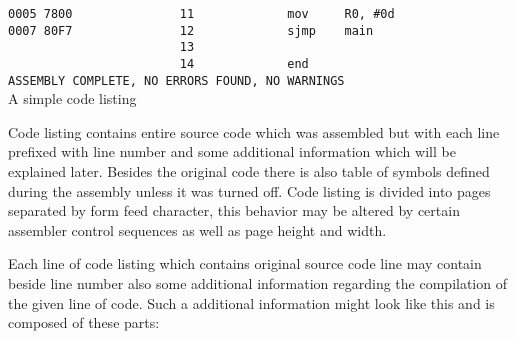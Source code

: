 \begin{code}[h]
                        {\color{highlight_lst_address}\verb'0005'}{\color{highlight_lst_code}\verb' 7800'}{\color{highlight_lst_line}\verb'               11'}\verb'             '{\color{highlight_instruction}\verb'mov'}\verb'     '{\color{highlight_sfr}\verb'R0'}{\color{highlight_oper_sep}\verb','}\verb' '{\color{highlight_imm_dec}\verb'#0d'}\\
                        {\color{highlight_lst_address}\verb'0007'}{\color{highlight_lst_code}\verb' 80F7'}{\color{highlight_lst_line}\verb'               12'}\verb'             '{\color{highlight_instruction}\verb'sjmp'}\verb'    '{\color{highlight_constant}\verb'main'}\\
                        {\color{highlight_lst_line}\verb'                        13'}\\
                        {\color{highlight_lst_line}\verb'                        14'}\verb'             '{\color{highlight_directive}\verb'end'}\\
                        {\color{highlight_lst_msg}\verb'ASSEMBLY COMPLETE,'}\verb' NO ERRORS FOUND, NO WARNINGS'\\
                        \caption{A simple code listing}
                \end{code}
                Code listing contains entire source code which was assembled but with each line prefixed with line number and some additional information which will be explained later. Besides the original code there is also table of symbols defined during the assembly unless it was turned off. Code listing is divided into pages separated by form feed character, this behavior may be altered by certain assembler control sequences as well as page height and width.

                Each line of code listing which contains original source code line may contain beside line number also some additional information regarding the compilation of the given line of code. Such a additional information might look like this and is composed of these parts:

